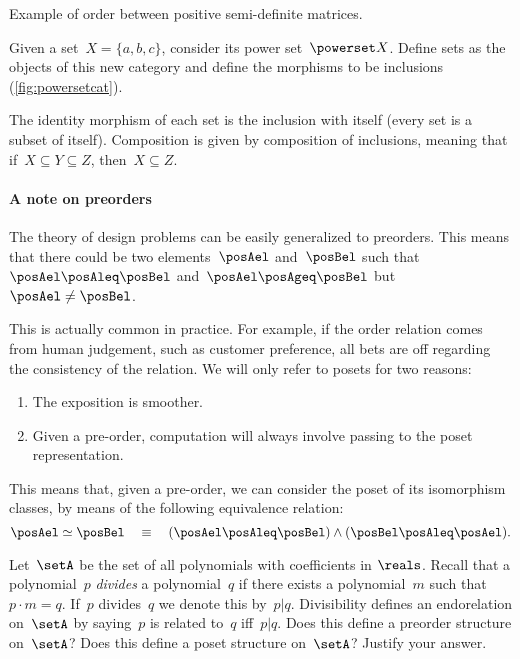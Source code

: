 \begin{marginfigure}
    \begin{center}
\end{center}
    \caption{Example of order between positive semi-definite matrices.}
    \label{fig:posdef_hasse}
\end{marginfigure}

  \begin{example}
    \label{ex:hasseinclusion}
    Given a set~$X=\{a,b,c\}$, consider its power set~$\powerset X$.
    Define sets as the objects of this new category and define the morphisms to be inclusions (\cref{fig:powersetcat}).

    The identity morphism of each set is the inclusion with itself (every set is a subset of itself).
    Composition is given by composition of inclusions, meaning that if~$X\subseteq Y \subseteq Z$, then~$X\subseteq Z$.
  \end{example}


\paragraph{A note on preorders}
The theory of design problems can be easily generalized to preorders.
This means that there could be two elements~$\posAel$ and~$\posBel$ such that~$\posAel\posAleq \posBel$ and~$\posAel \posAgeq \posBel$ but~$\posAel \neq \posBel$.

This is actually common in practice.
For example, if the order relation comes from human judgement, such as customer preference, all bets are off regarding the consistency of the relation.
We will only refer to posets for two reasons:
\begin{enumerate}
  \item The exposition is smoother.
  \item Given a pre-order, computation will always involve passing to the poset representation.
\end{enumerate}
This means that, given a pre-order, we can consider the poset of its isomorphism classes, by means of the following equivalence relation:
\begin{equation}
  \posAel \simeq \posBel \quad \equiv \quad (\posAel \posAleq \posBel) \wedge (\posBel \posAleq \posAel).
\end{equation}

\begin{gradedexercise}\label{ex:PolynomialDivisibility}
Let~$\setA$ be the set of all polynomials with coefficients in $\reals$.
Recall that a polynomial~$p$ \emph{divides} a polynomial~$q$ if there exists a polynomial~$m$ such that~$p \cdot m = q$.
If~$p$ divides~$q$ we denote this by~$p \vert q$.
Divisibility defines an endorelation on~$\setA$ by saying~$p$ is related to~$q$ iff~$p \vert q$.
Does this define a preorder structure on~$\setA$? Does this define a poset structure on~$\setA$? Justify your answer.
\end{gradedexercise}

